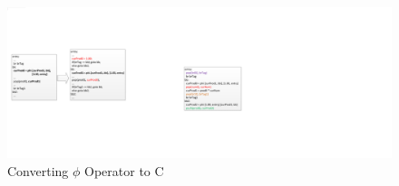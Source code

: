 \begin{figure}[htp]
\begin{center}
\includegraphics[width=0.7\linewidth]{chap3fig/SSA2C.pdf}
\caption{Converting $\phi$ Operator to C
\label{fig:phi2c}}
\end{center}
\end{figure}

